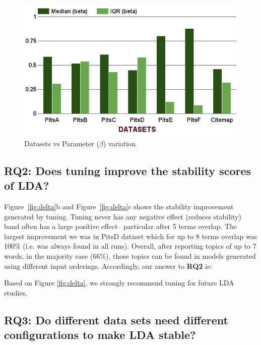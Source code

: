 \documentclass[10pt,conference]{IEEEtran}
\theoremstyle{break}
\begin{document}
\begin{figure}[!htbp]
\begin{minipage}{.33\textwidth}
        \includegraphics[width=\linewidth]{./fig/Parameters_variation_b.png}
        \caption{Datasets vs Parameter ($\beta$) variation}
        \label{RQ3:b}
    \end{minipage}
\end{figure}

\subsection{\textbf{RQ2: Does tuning improve the stability scores of LDA?}}

 Figure~\ref{fig:delta}b and Figure~\ref{fig:delta}c shows the stability improvement
 generated by tuning.
   Tuning never
  has any negative effect (reduces stability) band often has a large positive effect--
  particular  after 5 terms overlap.
   The largest improvement  we
   was  in PitsD dataset which for up to 8 terms overlap was 100\% (i.e. was always
   found in all runs).
   Overall, after reporting topics of up to 7 words, in the majority case (66\%),
  those topics can be found in models generated using different input orderings.
  Accordingly, our answer to {\bf RQ2} is:

\begin{lesson}
Based on Figure \ref{fig:delta}, we strongly recommend tuning for future LDA studies.
\end{lesson}






\subsection{\textbf{RQ3: Do different data sets
      need different configurations to make LDA stable?}}
\end{document}
